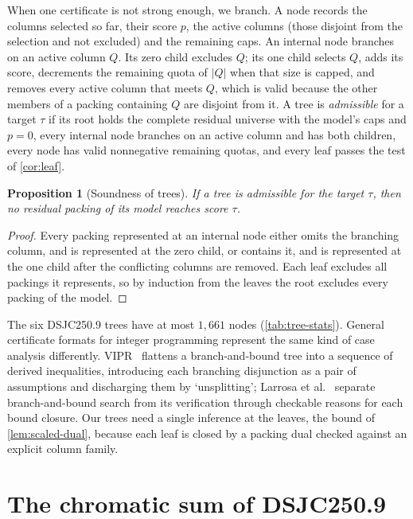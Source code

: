\documentclass[11pt]{article}
\newtheorem{proposition}[theorem]{Proposition}
\theoremstyle{definition}
\newcommand{\DSJCTwoFifty}{\textnormal{\textsc{DSJC250.9}}}
\begin{document}
When one certificate is not strong enough, we branch. A node records the
columns selected so far, their score $p$, the active columns (those disjoint
from the selection and not excluded) and the remaining caps. An internal node
branches on an active column $Q$. Its zero child excludes $Q$; its one child
selects $Q$, adds its score, decrements the remaining quota of $|Q|$ when that
size is capped, and removes every active column that meets $Q$, which is valid
because the other members of a packing
containing $Q$ are disjoint from it. A tree is \emph{admissible} for a target
$\tau$ if its root holds the complete residual universe with the model's
caps and $p=0$, every internal node branches on an active column and has both
children, every node has valid nonnegative remaining quotas, and every leaf
passes the test of \cref{cor:leaf}.

\begin{proposition}[Soundness of trees]
\label{prop:tree-soundness}
If a tree is admissible for the target $\tau$, then no residual packing of
its model reaches score $\tau$.
\end{proposition}

\begin{proof}
Every packing represented at an internal node either omits the branching
column, and is represented at the zero child, or contains it, and is
represented at the one child after the conflicting columns are removed. Each
leaf excludes all packings it represents, so by induction from the leaves the
root excludes every packing of the model.
\end{proof}

The six \DSJCTwoFifty{} trees have at most $1{,}661$ nodes
(\cref{tab:tree-stats}). General certificate formats for integer programming
represent the same kind of case analysis differently. VIPR~\cite{cheung2017}
flattens a branch-and-bound tree into a sequence of derived inequalities,
introducing each branching disjunction as a pair of assumptions and
discharging them by `unsplitting'; Larrosa et al.~\cite{larrosa2011} separate
branch-and-bound search from its verification through checkable reasons for
each bound closure. Our trees need a single inference at the leaves, the
bound of \cref{lem:scaled-dual}, because each leaf is closed by a packing
dual checked against an explicit column family.

\section{The chromatic sum of \DSJCTwoFifty{}}
\label{sec:dsjc250}
\end{document}
